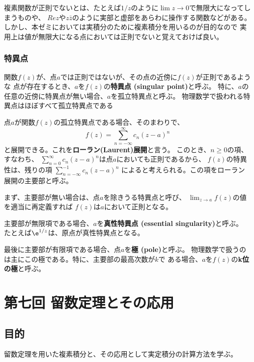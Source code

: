 複素関数が正則でないとは、たとえば$1/z$のように$\lim z \rightarrow 0$で無限大になってしまうものや、
$Re z$や$z \bar{z}$のように実部と虚部をあらわに操作する関数などがある。
しかし、本ゼミにおいては実積分のために複素積分を用いるのが目的なので
実用上は値が無限大になる点においては正則でないと覚えておけば良い。

\subsubsection{特異点}

関数$f(z)$が、点$a$では正則ではないが、その点の近傍に$f(z)$が正則であるような
点が存在するとき、$a$を$f(z)$の{\bf 特異点 (singular point)}と呼ぶ。
特に、$a$の任意の近傍に特異点が無い場合、$a$を孤立特異点と呼ぶ。
物理数学で扱われる特異点はほぼすべて孤立特異点である

点$a$が関数$f(z)$の孤立特異点である場合、そのまわりで、
\begin{equation}
  f(z) = \sum_{n=-\infty}^{\infty} c_n(z-a)^n
\end{equation}
と展開できる。これを{\bf ローラン(Laurent)展開}と言う。
このとき、$n\ge 0$の項、すなわち、
$\sum_{n=0}^{\infty} c_n(z-a)^n$は点$a$においても正則であるから、
$f(z)$の特異性は、残りの項
$\sum_{n=-\infty}^{-1} c_n(z-a)^n$
によると考えられる。この項をローラン展開の主要部と呼ぶ。

まず、主要部が無い場合は、点$a$を除きうる特異点と呼び、
$\lim_{z\rightarrow a} f(z)$の値を適当に再定義すれば
$f(z)$は$a$において正則となる。

主要部が無限項である場合、$a$を{\bf 真性特異点 (essential singularity)}と呼ぶ。
たとえば$\e^{1/z}$は、原点が真性特異点となる。

最後に主要部が有限項である場合、点$a$を{\bf 極 (pole)}と呼ぶ。
物理数学で扱うのは主にこの極である。特に、主要部の最高次数が$k$で
ある場合、$a$を$f(z)$の{\bf k位の極}と呼ぶ。


\newpage
\section{第七回 留数定理とその応用}

\subsection{目的}

留数定理を用いた複素積分と、その応用として実定積分の計算方法を学ぶ。

